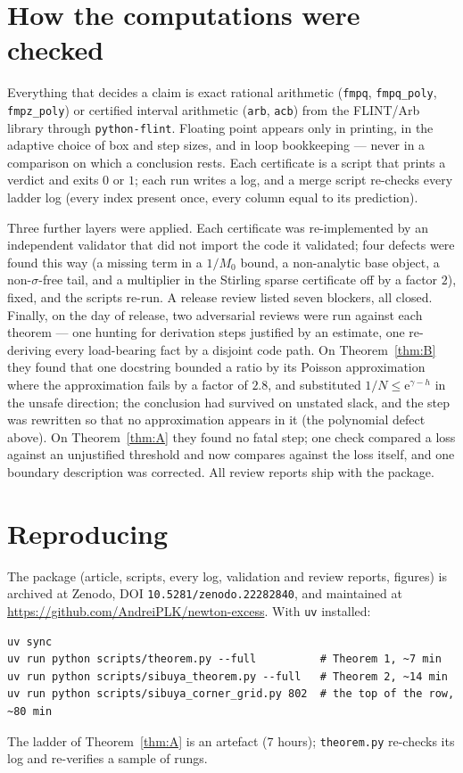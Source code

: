 \documentclass[12pt]{article}
\newcommand{\ee}{\mathrm{e}}
\begin{document}
\section{How the computations were checked}\label{sec:method}

Everything that decides a claim is exact rational arithmetic (\texttt{fmpq}, \texttt{fmpq\_poly}, \texttt{fmpz\_poly}) or certified interval arithmetic (\texttt{arb}, \texttt{acb}) from the FLINT/Arb library \cite{Arb2017} through \texttt{python-flint}. Floating point appears only in printing, in the adaptive choice of box and step sizes, and in loop bookkeeping --- never in a comparison on which a conclusion rests. Each certificate is a script that prints a verdict and exits $0$ or $1$; each run writes a log, and a merge script re-checks every ladder log (every index present once, every column equal to its prediction).

Three further layers were applied. Each certificate was re-implemented by an independent validator that did not import the code it validated; four defects were found this way (a missing term in a $1/M_0$ bound, a non-analytic base object, a non-$\sigma$-free tail, and a multiplier in the Stirling sparse certificate off by a factor $2$), fixed, and the scripts re-run. A release review listed seven blockers, all closed. Finally, on the day of release, two adversarial reviews were run against each theorem --- one hunting for derivation steps justified by an estimate, one re-deriving every load-bearing fact by a disjoint code path. On Theorem~\ref{thm:B} they found that one docstring bounded a ratio by its Poisson approximation where the approximation fails by a factor of $2.8$, and substituted $1/N\le\ee^{\gamma-h}$ in the unsafe direction; the conclusion had survived on unstated slack, and the step was rewritten so that no approximation appears in it (the polynomial defect above). On Theorem~\ref{thm:A} they found no fatal step; one check compared a loss against an unjustified threshold and now compares against the loss itself, and one boundary description was corrected. All review reports ship with the package.

\section{Reproducing}

The package (article, scripts, every log, validation and review reports, figures) is archived at Zenodo, DOI \texttt{10.5281/zenodo.22282840}, and maintained at \url{https://github.com/AndreiPLK/newton-excess}. With \texttt{uv} installed:
\begin{verbatim}
uv sync
uv run python scripts/theorem.py --full          # Theorem 1, ~7 min
uv run python scripts/sibuya_theorem.py --full   # Theorem 2, ~14 min
uv run python scripts/sibuya_corner_grid.py 802  # the top of the row, ~80 min
\end{verbatim}
The ladder of Theorem~\ref{thm:A} is an artefact (7 hours); \texttt{theorem.py} re-checks its log and re-verifies a sample of rungs.
\end{document}
